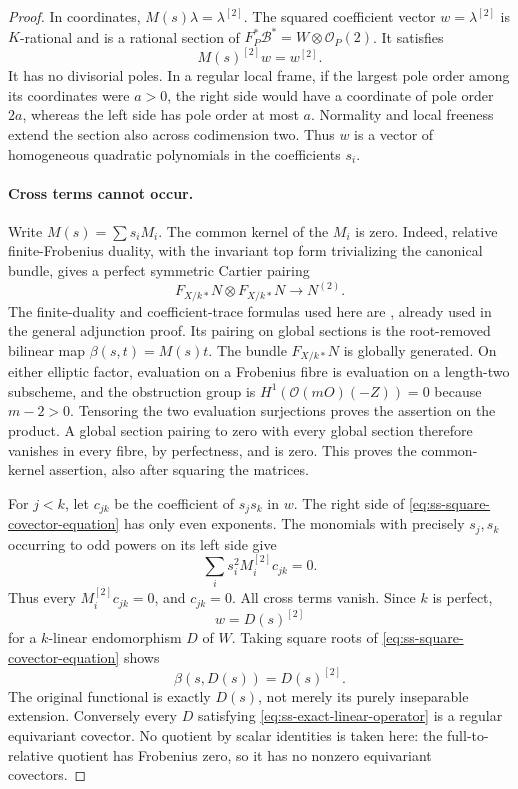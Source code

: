 \begin{proof}
In coordinates, $M(s)\lambda=\lambda^{[2]}$. The squared coefficient
vector $w=\lambda^{[2]}$ is $K$-rational and is a rational section of
$F_P^*\mathcal B^*=W\otimes\mathcal O_P(2)$. It satisfies
\begin{equation}\label{eq:ss-square-covector-equation}
                       M(s)^{[2]}w=w^{[2]}.
\end{equation}
It has no divisorial poles. In a regular local frame, if the largest
pole order among its coordinates were $a>0$, the right side would
have a coordinate of pole order $2a$, whereas the left side has
pole order at most $a$. Normality and local freeness extend the
section also across codimension two. Thus $w$ is a vector of
homogeneous quadratic polynomials in the coefficients $s_i$.

\paragraph{Cross terms cannot occur.}
Write $M(s)=\sum s_i M_i$. The common kernel of the $M_i$ is zero.
Indeed, relative finite-Frobenius duality, with the invariant top
form trivializing the canonical bundle, gives a perfect symmetric
Cartier pairing
\begin{equation}\label{eq:ss-perfect-Cartier-pairing}
 F_{X/k*}N\otimes F_{X/k*}N\longrightarrow N^{(2)}.
\end{equation}
The finite-duality and coefficient-trace formulas used here are
\cite[Lemma~1.3.6, Proposition~1.3.7, Theorem~1.3.8, pp.~26--28]
{BrionKumar2005}, already used in the general adjunction proof.
Its pairing on global sections is the root-removed bilinear map
$\beta(s,t)=M(s)t$. The bundle $F_{X/k*}N$ is globally generated.
On either elliptic factor, evaluation on a Frobenius fibre is
evaluation on a length-two subscheme, and the obstruction group is
$H^1(\mathcal O(mO)(-Z))=0$ because $m-2>0$.
Tensoring the two evaluation surjections proves the assertion on
the product. A global section pairing to zero with every global
section therefore vanishes in every fibre, by perfectness, and
is zero. This proves the common-kernel assertion, also after
squaring the matrices.

For $j<k$, let $c_{jk}$ be the coefficient of $s_js_k$ in $w$.
The right side of \eqref{eq:ss-square-covector-equation} has only
even exponents. The monomials with precisely $s_j,s_k$ occurring
to odd powers on its left side give
\[
              \sum_i s_i^2M_i^{[2]}c_{jk}=0.
\]
Thus every $M_i^{[2]}c_{jk}=0$, and $c_{jk}=0$.
All cross terms vanish. Since $k$ is perfect,
\[
                         w=D(s)^{[2]}
\]
for a $k$-linear endomorphism $D$ of $W$. Taking square roots of
\eqref{eq:ss-square-covector-equation} shows
\begin{equation}\label{eq:ss-exact-linear-operator}
                 \beta(s,D(s))=D(s)^{[2]}.
\end{equation}
The original functional is exactly $D(s)$, not merely its
purely inseparable extension. Conversely every $D$ satisfying
\eqref{eq:ss-exact-linear-operator} is a regular equivariant
covector. No quotient by scalar identities is taken here:
the full-to-relative quotient has Frobenius zero, so it has no
nonzero equivariant covectors.


\end{proof}
